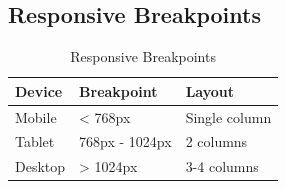 \subsection{Responsive Breakpoints}

\begin{table}[H]
\centering
\begin{tabular}{|l|l|l|}
\hline
\textbf{Device} & \textbf{Breakpoint} & \textbf{Layout} \\
\hline
Mobile & < 768px & Single column \\
Tablet & 768px - 1024px & 2 columns \\
Desktop & > 1024px & 3-4 columns \\
\hline
\end{tabular}
\caption{Responsive Breakpoints}
\end{table}
